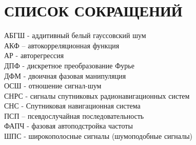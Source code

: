 \section*{СПИСОК СОКРАЩЕНИЙ}
АБГШ - аддитивный белый гауссовский шум				\\
АКФ – автокорреляционная функция				\\
АР - авторегрессия						\\
ДПФ - дискретное преобразование Фурье				\\
ДФМ - двоичная фазовая манипуляция				\\
ОСШ - отношение сигнал-шум 					\\
СНРС - сигналы спутниковых радионавигационных систем		\\
СНС - Спутниковая навигационная система				\\
ПСП – псевдослучайная последовательность			\\
ФАПЧ - фазовая автоподстройка частоты				\\
ШПС -  широкополосные сигналы (шумоподобные сигналы)		\\
\newpage
